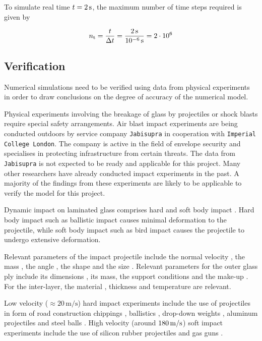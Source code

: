 \documentclass[12pt,twoside]{article}
\theoremstyle{break}
\begin{document}
To simulate real time $t=2\,{\rm{s}}$, the maximum number of time steps required \cite{Far19} is given by

\begin{equation}
    n_{\rm{t}}=\frac{t}{\Delta t}=\frac{2\,{\rm{s}}}{10^{-6}\,{\rm{s}}}=2\cdot10^6
\end{equation}

\subsection{Verification}

Numerical simulations need to be verified using data from physical experiments in order to draw conclusions on the degree of accuracy of the numerical model.

\bigbreak
Physical experiments involving the breakage of glass by projectiles or shock blasts require special safety arrangements. Air blast impact experiments are being conducted outdoors by service company \texttt{Jabisupra} \cite{Jab16} in cooperation with \texttt{Imperial College London}. The company is active in the field of envelope security and specialises in protecting infrastructure from certain threats. The data from \texttt{Jabisupra} is not expected to be ready and applicable for this project. Many other researchers have already conducted impact experiments in the past. A majority of the findings from these experiments are likely to be applicable to verify the model for this project.

\bigbreak
Dynamic impact on laminated glass comprises hard and soft body impact \cite{Moh17}. Hard body impact such as ballistic impact \cite{Bra10} causes minimal deformation to the projectile, while soft body impact such as bird impact \cite{Moh17} causes the projectile to undergo extensive deformation.

\bigbreak
Relevant parameters of the impact projectile include the normal velocity \cite{Gra98, Kar14, Dar13, Wu14}, the mass \cite{Kar14, Dar13}, the angle \cite{Gra98, Kar14, Dar13}, the shape \cite{Dar13} and the size \cite{Wu14}. Relevant parameters for the outer glass ply include its dimensions \cite{Wan18}, its mass, the support conditions \cite{Wan18} and the make-up \cite{Wan18}. For the inter-layer, the material \cite{Moh18, Wan18, Mon04}, thickness \cite{Ji98, Kar14, Wan18} and temperature \cite{Moh18, Zha19} are relevant.

\bigbreak
Low velocity ($\approx 20\,\mathrm{m}/\mathrm{s}$) hard impact experiments include the use of projectiles in form of road construction chippings \cite{Gra98}, ballistics \cite{Mon04}, drop-down weights \cite{Che15, Mil12, Wan18}, aluminum projectiles \cite{Mil12} and steel balls \cite{Beh99, Flo98, Wan18}. High velocity (around $180\, {\rm{m}}/{\rm{s}}$) soft impact experiments include the use of silicon rubber projectiles \cite{Moh17} and gas guns \cite{Moh18}.
\end{document}
